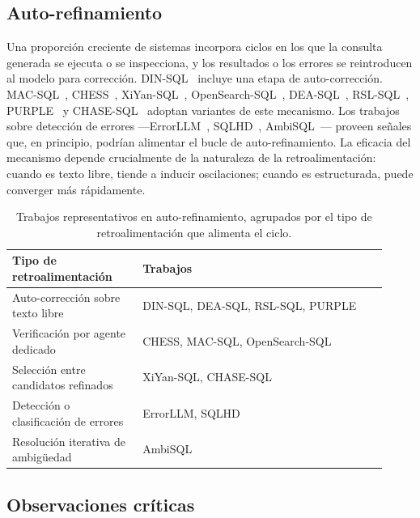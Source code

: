 \subsection{Auto-refinamiento}
\label{subsec:sota-d4-refinement}

Una proporción creciente de sistemas incorpora ciclos en los que la
consulta generada se ejecuta o se inspecciona, y los resultados o los
errores se reintroducen al modelo para corrección.
DIN-SQL~\cite{DIN-SQL2023} incluye una etapa de auto-corrección.
MAC-SQL~\cite{MAC-SQL2023}, CHESS~\cite{CHESS2024},
XiYan-SQL~\cite{XiYan-SQL2024}, OpenSearch-SQL~\cite{OpenSearch-SQL2025},
DEA-SQL~\cite{DEA-SQL2024}, RSL-SQL~\cite{RSL-SQL2024},
PURPLE~\cite{PURPLE2024} y CHASE-SQL~\cite{CHASE-SQL2025} adoptan
variantes de este mecanismo. Los trabajos sobre detección de errores
---ErrorLLM~\cite{errorllm2026}, SQLHD~\cite{SQLHD2025},
AmbiSQL~\cite{AmbiSQL}--- proveen señales que, en principio, podrían
alimentar el bucle de auto-refinamiento. La eficacia del mecanismo
depende crucialmente de la naturaleza de la retroalimentación: cuando %
es texto libre, tiende a inducir oscilaciones; cuando es estructurada,
puede converger más rápidamente.

\begin{table}[!htbp]
\centering
\footnotesize
\caption{Trabajos representativos en auto-refinamiento, agrupados por el tipo de retroalimentación que alimenta el ciclo.}
\label{tab:sota-d4-refinement}
\begin{tabular}{@{}p{0.32\linewidth}p{0.60\linewidth}@{}}
\toprule
\textbf{Tipo de retroalimentación} & \textbf{Trabajos} \\
\midrule
Auto-corrección sobre texto libre & DIN-SQL, DEA-SQL, RSL-SQL, PURPLE \\
Verificación por agente dedicado & CHESS, MAC-SQL, OpenSearch-SQL \\
Selección entre candidatos refinados & XiYan-SQL, CHASE-SQL \\
Detección o clasificación de errores & ErrorLLM, SQLHD \\
Resolución iterativa de ambigüedad & AmbiSQL \\
\bottomrule
\end{tabular}
\end{table}

\subsection{Observaciones críticas}
\label{subsec:sota-d4-obs}

